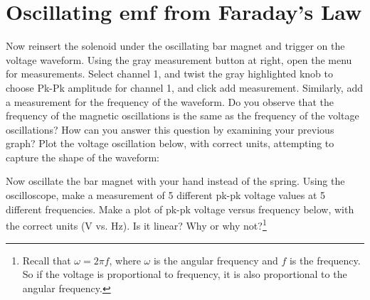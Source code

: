 \documentclass[12pt]{article}
\begin{document}
\section{Oscillating emf from Faraday's Law}

Now reinsert the solenoid under the oscillating bar magnet and trigger on the voltage waveform.  Using the gray measurement button at right, open the menu for measurements.  Select channel 1, and twist the gray highlighted knob to choose Pk-Pk amplitude for channel 1, and click add measurement.  Similarly, add a measurement for the frequency of the waveform.  Do you observe that the frequency of the magnetic oscillations is the same as the frequency of the voltage oscillations?  How can you answer this question by examining your previous graph?  Plot the voltage oscillation below, with correct units, attempting to capture the shape of the waveform: \\ \vspace{3cm}

Now oscillate the bar magnet with your hand instead of the spring.  Using the oscilloscope, make a measurement of 5 different pk-pk voltage values at 5 different frequencies.  Make a plot of pk-pk voltage versus frequency below, with the correct units (V vs. Hz).  Is it linear?  Why or why not?\footnote{Recall that $\omega = 2\pi f$, where $\omega$ is the angular frequency and $f$ is the frequency.  So if the voltage is proportional to frequency, it is also proportional to the angular frequency.} \\ \vspace{3cm}
\end{document}
